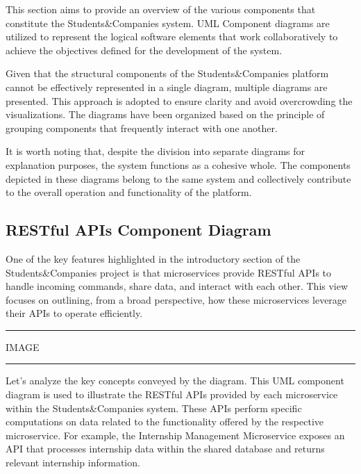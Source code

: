This section aims to provide an overview of the various components that constitute the Students\&Companies system. UML Component diagrams are utilized to represent the logical software elements that work collaboratively to achieve the objectives defined for the development of the system.

Given that the structural components of the Students\&Companies platform cannot be effectively represented in a single diagram, multiple diagrams are presented. This approach is adopted to ensure clarity and avoid overcrowding the visualizations. The diagrams have been organized based on the principle of grouping components that frequently interact with one another.

It is worth noting that, despite the division into separate diagrams for explanation purposes, the system functions as a cohesive whole. The components depicted in these diagrams belong to the same system and collectively contribute to the overall operation and functionality of the platform.

\subsection{RESTful APIs Component Diagram}

One of the key features highlighted in the introductory section of the Students\&Companies project is that microservices provide RESTful APIs to handle incoming commands, share data, and interact with each other. This view focuses on outlining, from a broad perspective, how these microservices leverage their APIs to operate efficiently.

\vspace{20pt}
\hrule
\vspace{10pt}
IMAGE
\vspace{10pt}
\hrule
\vspace{20pt}

Let’s analyze the key concepts conveyed by the diagram. This UML component diagram is used to illustrate the RESTful APIs provided by each microservice within the Students\&Companies system. These APIs perform specific computations on data related to the functionality offered by the respective microservice. For example, the Internship Management Microservice exposes an API that processes internship data within the shared database and returns relevant internship information.

